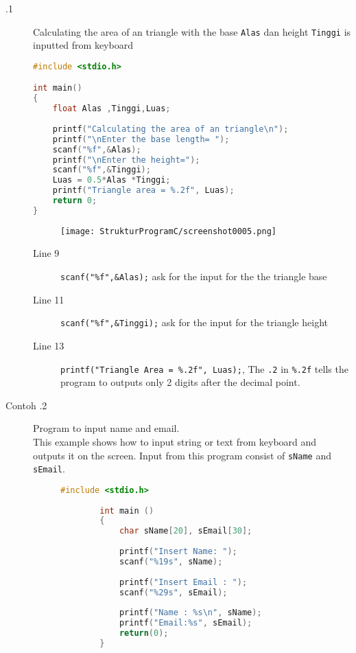 \begin{description}
	\item  [\thesection.1] Calculating the area of an triangle  with the base \verb*|Alas|   dan height \verb*|Tinggi| is inputted from keyboard 
	\begin{lstlisting}[language=c]
#include <stdio.h>

int main()
{
	float Alas ,Tinggi,Luas;
	
	printf("Calculating the area of an triangle\n");
	printf("\nEnter the base length= ");
	scanf("%f",&Alas);
	printf("\nEnter the height=");
	scanf("%f",&Tinggi);
	Luas = 0.5*Alas *Tinggi;
	printf("Triangle area = %.2f", Luas);
	return 0;
}
	\end{lstlisting}
\begin{figure}[H]
	\centering
	\texttt{[image: StrukturProgramC/screenshot0005.png]}
	\caption{}
	\label{fig:screenshot0005}
\end{figure}

\begin{description}
	\item [Line 9]\verb|scanf("%f",&Alas);| ask for the input for the the triangle base
	\item [Line 11]\verb|scanf("%f",&Tinggi);| ask for the input for the triangle height
	\item [Line 13]\verb|printf("Triangle Area = %.2f", Luas);|, The \verb|.2| in \verb|%.2f| tells the program to outputs only 2 digits after the decimal point.%
\end{description}

	\item[Contoh \thesection.2] Program to input name and email.\\
	This example shows how to input string or text from keyboard and outputs it on the screen. Input from this program consist of \verb|sName| and \verb|sEmail|.
	\begin{figure}[H]
	\begin{lstlisting}[language=c]
		#include <stdio.h>
		
		int main () 
		{
			char sName[20], sEmail[30];
			
			printf("Insert Name: ");
			scanf("%19s", sName);
			
			printf("Insert Email : ");
			scanf("%29s", sEmail);
			
			printf("Name : %s\n", sName);
			printf("Email:%s", sEmail);
			return(0);
		}
	\end{lstlisting}
\end{figure}
\end{description}


